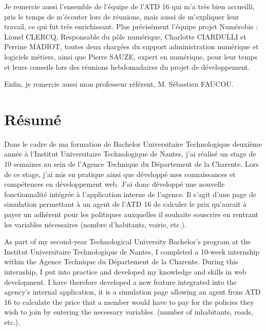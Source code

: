 \documentclass[a4paper,12pt]{report}
\begin{document}
\vspace{1em}

Je remercie aussi l’ensemble de l’équipe de l’ATD 16 qui m’a très bien accueilli, pris le temps de m’écouter lors de réunions, mais aussi de m’expliquer leur travail, ce qui fut très enrichissant. Plus précisément l'équipe projet Numérobis : Lionel CLERCQ, Responsable du pôle numérique, Charlotte CIARDULLI et Perrine MADIOT, toutes deux chargées du support administration numérique et logiciels métiers, ainsi que Pierre SAUZE, expert en numérique, pour leur temps et leurs conseils lors des réunions hebdomadaires du projet de développement.

\vspace{1em}

Enfin, je remercie aussi mon professeur référent, M. Sébastien FAUCOU.

\newpage
\chapter*{Résumé}
\thispagestyle{empty}

Dans le cadre de ma formation de Bachelor Universitaire Technologique deuxième année à l’Institut Universitaire Technologique de Nantes, j’ai réalisé un stage de 10 semaines au sein de l’Agence Technique du Département de la Charente. Lors de ce stage, j’ai mis en pratique ainsi que développé mes connaissances et compétences en développement web. J’ai donc développé une nouvelle fonctionnalité intégrée à l'application interne de l’agence. Il s'agit d'une page de simulation permettant à un agent de l'ATD 16 de calculer le prix qu’aurait à payer un adhérent pour les politiques auxquelles il souhaite souscrire en rentrant les variables nécessaires (nombre d’habitants, voirie, etc.).


As part of my second-year Technological University Bachelor’s program at the Institut Universitaire Technologique de Nantes, I completed a 10-week internship within the Agence Technique du Département de la Charente. During this internship, I put into practice and developed my knowledge and skills in web development. I have therefore developed a new feature integrated into the agency’s internal application, it is a simulation page allowing an agent from ATD 16 to calculate the price that a member would have to pay for the policies they wish to join by entering the necessary variables. (number of inhabitants, roads, etc.).

\tableofcontents               
\end{document}

